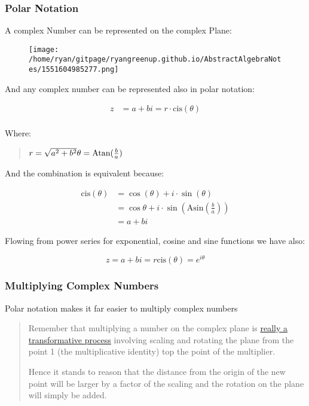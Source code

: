 \documentclass[
]{article}
\begin{document}
\hypertarget{header-n952}{%
\subsubsection{Polar Notation}\label{header-n952}}

A complex Number can be represented on the complex Plane:

\begin{figure}
\centering
\texttt{[image: /home/ryan/gitpage/ryangreenup.github.io/AbstractAlgebraNotes/1551604985277.png]}
\caption{}
\end{figure}

And any complex number can be represented also in polar notation:

\begin{align}
z &= a +bi = r \cdot \text{cis}(\theta) \\
\end{align}

Where:

\begin{quote}
\(r = \sqrt{a^2 +b^2} \\
\theta = \text{Atan}(\frac{b}{a})\)
\end{quote}

And the combination is equivalent because:

\begin{align}
\text{cis}(\theta) & = \cos(\theta) + i \cdot \sin(\theta) \\
&= \cos{\theta} + i\cdot \sin{\left ( \text{Asin}\left( \frac{b}{a} \right ) \right )} \\
&=a + bi
\end{align}

Flowing from power series for exponential, cosine and sine functions we
have also:

\[z = a + bi = r \text{cis}(\theta) = e^{i\theta}\]

\hypertarget{header-n965}{%
\subsubsection{Multiplying Complex Numbers}\label{header-n965}}

Polar notation makes it far easier to multiply complex numbers

\begin{quote}
Remember that multiplying a number on the complex plane is
\href{https://www.youtube.com/watch?v=mvmuCPvRoWQ}{really a
transformative process} involving scaling and rotating the plane from
the point 1 (the multiplicative identity) top the point of the
multiplier.

Hence it stands to reason that the distance from the origin of the new
point will be larger by a factor of the scaling and the rotation on the
plane will simply be added.
\end{quote}
\end{document}
